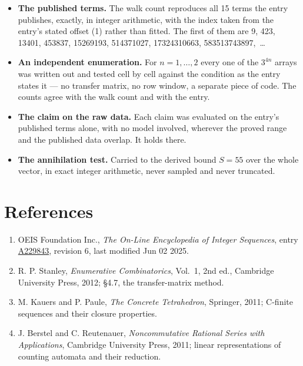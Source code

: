 \documentclass[11pt]{article}
\theoremstyle{definition}
\begin{document}
\begin{itemize}

\item {\bfseries The published terms.} The walk count reproduces all 15 terms the entry publishes, exactly, in integer arithmetic, with the index taken from the entry's stated offset (1) rather than fitted. The first of them are 9, 423, 13401, 453837, 15269193, 514371027, 17324310663, 583513743897,~\dots

\item {\bfseries An independent enumeration.} For $n = 1,\dots,2$ every one of the $3^{4n}$ arrays was written out and tested cell by cell against the condition as the entry states it --- no transfer matrix, no row window, a separate piece of code. The counts agree with the walk count and with the entry.

\item {\bfseries The claim on the raw data.} Each claim was evaluated on the entry's published terms alone, with no model involved, wherever the proved range and the published data overlap. It holds there.

\item {\bfseries The annihilation test.} Carried to the derived bound $S = 55$ over the whole vector, in exact integer arithmetic, never sampled and never truncated.

\end{itemize}

\section{References}

\begin{enumerate}

\item OEIS Foundation Inc., \emph{The On-Line Encyclopedia of Integer Sequences}, entry \href{https://oeis.org/A229843}{A229843}, revision 6, last modified Jun 02 2025.

\item R. P. Stanley, \emph{Enumerative Combinatorics}, Vol.~1, 2nd ed., Cambridge University Press, 2012; \S4.7, the transfer-matrix method.

\item M. Kauers and P. Paule, \emph{The Concrete Tetrahedron}, Springer, 2011; C-finite sequences and their closure properties.

\item J. Berstel and C. Reutenauer, \emph{Noncommutative Rational Series with Applications}, Cambridge University Press, 2011; linear representations of counting automata and their reduction.

\end{enumerate}
\end{document}
